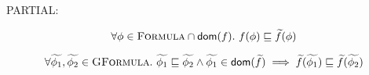 PARTIAL:

\begin{displaymath}
\forall \phi \in \textsc{Formula} \cap \textsf{dom}(f).~ f(\phi) \sqsubseteq \widetilde{f}(\phi)
\end{displaymath}

\begin{displaymath}
\forall \widetilde{\phi_1}, \widetilde{\phi_2} \in \textsc{GFormula}.~ \widetilde{\phi_1} \sqsubseteq \widetilde{\phi_2} \wedge \widetilde{\phi_1} \in \textsf{dom}(\widetilde{f}) \implies \widetilde{f}(\widetilde{\phi_1}) \sqsubseteq \widetilde{f}(\widetilde{\phi_2})
\end{displaymath}



